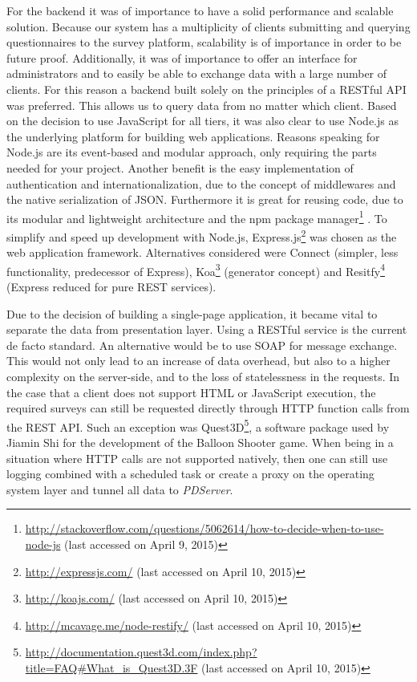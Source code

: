 		For the backend it was of importance to have a solid performance and scalable solution. Because our system has a multiplicity of clients submitting and querying questionnaires to the survey platform, scalability is of importance in order to be future proof. 		Additionally, it was of importance to offer an interface for administrators and to easily be able to exchange data with a large number of clients. For this reason a backend built solely on the principles of a RESTful API was preferred. This allows us to query data from no matter which client.
		Based on the decision to use JavaScript for all tiers, it was also clear to use Node.js as the underlying platform for building web applications. Reasons speaking for Node.js are its event-based and modular approach, only requiring the parts needed for your project. Another benefit is the easy implementation of authentication and internationalization, due to the concept of middlewares \cite{Heise2014RESTConnect} and the native serialization of JSON. Furthermore it is great for reusing code, due to its modular and lightweight architecture and the npm package manager\footnote{\url{http://stackoverflow.com/questions/5062614/how-to-decide-when-to-use-node-js} (last accessed on April 9, 2015)} \cite{Heise2014NodeProCon}. To simplify and speed up development with Node.js, Express.js\footnote{\url{http://expressjs.com/} (last accessed on April 10, 2015)} was chosen as the web application framework. Alternatives considered were Connect (simpler, less functionality, predecessor of Express), Koa\footnote{\url{http://koajs.com/} (last accessed on April 10, 2015)} (generator concept) and Resitfy\footnote{\url{http://mcavage.me/node-restify/} (last accessed on April 10, 2015)} (Express reduced for pure REST services). 

		Due to the decision of building a single-page application, it became vital to separate the data from presentation layer. Using a RESTful service is the current de facto standard. An alternative would be to use SOAP for message exchange. This would not only lead to an increase of data overhead, but also to a higher complexity on the server-side, and to the loss of statelessness in the requests. In the case that a client does not support HTML or JavaScript execution, the required surveys can still be requested directly through HTTP function calls from the REST API. Such an exception was Quest3D\footnote{\url{http://documentation.quest3d.com/index.php?title=FAQ\#What_is_Quest3D.3F} (last accessed on April 10, 2015)}, a software package used by Jiamin Shi for the development of the Balloon Shooter game. When being in a situation where HTTP calls are not supported natively, then one can still use logging combined with a scheduled task or create a proxy on the operating system layer and tunnel all data to \textit{PDServer}.





